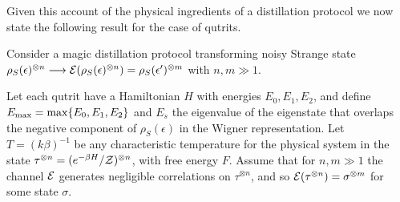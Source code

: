 \documentclass[pra,
aps,
twocolumn,
superscriptaddress,
groupedaddress,
nofootinbib,
reprint
]{revtex4-1}
\begin{document}
 Given this account of the physical ingredients of a distillation protocol we now state the following result for the case of qutrits.
\begin{theorem}\label{thm:free-energy}
	Consider a magic distillation protocol transforming noisy Strange state $\rho_S(\epsilon)^{\otimes n} \longrightarrow \mathcal{E}(\rho_S(\epsilon)^{\otimes n})=\rho_S(\epsilon')^{\otimes m}$ with $n, m \gg 1$.

Let each qutrit have a Hamiltonian $H$ with energies $E_0, E_1, E_2$, and define $E_{\rm max} = \max\{E_0, E_1, E_2\}$ and $E_s$ the eigenvalue of the eigenstate that overlaps the negative component of $\rho_S(\epsilon)$ in the Wigner representation. Let $T =(k\beta)^{-1}$ be any characteristic temperature for the physical system in the state $\tau^{\otimes n}= (e^{-\beta H}/\mathcal{Z})^{\otimes n}$, with free energy $F$. Assume that for $n,m \gg 1$ the channel $\mathcal{E}$ generates negligible correlations on $\tau^{\otimes n}$, and so $\mathcal{E}(\tau^{\otimes n}) = \sigma^{\otimes m}$ for some state $\sigma$.


\end{theorem}
\end{document}
